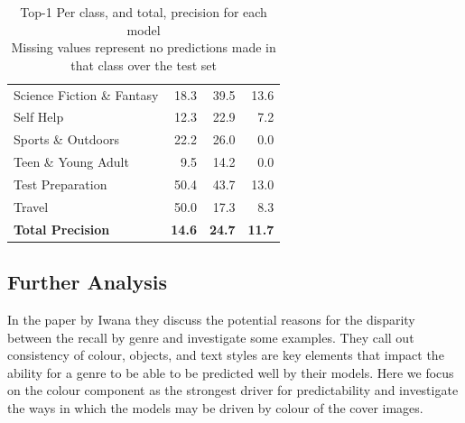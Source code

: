 \documentclass[12pt]{article}
\numberwithin{equation}{section}
\numberwithin{figure}{section}
\begin{document}
\begin{table}[]
\begin{tabular}{lrrr}
	Science Fiction \& Fantasy    & 18.3                                     & 39.5                                            & 13.6                                   \\
	Self Help                     & 12.3                                     & 22.9                                            & 7.2                                    \\
	Sports \& Outdoors            & 22.2                                     & 26.0                                            & 0.0                                    \\
	Teen \& Young Adult           & 9.5                                      & 14.2                                            & 0.0                                    \\
	Test Preparation              & 50.4                                     & 43.7                                            & 13.0                                   \\
	Travel                        & 50.0                                     & 17.3                                            & 8.3                                    \\ \hline
	\textbf{Total Precision}      & \textbf{14.6}                            & \textbf{24.7}                                   & \textbf{11.7}                          \\ \hline
	\end{tabular}%
	\caption{Top-1 Per class, and total, precision for each model \\ \tiny{Missing values represent no predictions made in that class over the test set}}
	\label{tab:test_prec}
	\end{table}

\subsection{Further Analysis} 
\label{sub:Further_Analysis} 
In the paper by Iwana they discuss the potential reasons for the disparity between the recall by genre and investigate some examples. They call out consistency of colour, objects, and text styles are key elements that impact the ability for a genre to be able to be predicted well by their models. Here we focus on the colour component as the strongest driver for predictability and investigate the ways in which the models may be driven by colour of the cover images.
\end{document}
